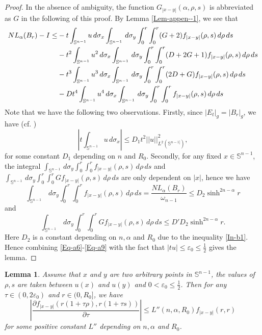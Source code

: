 \documentclass[11pt,reqno]{amsart}
\newtheorem{lem}[thm]{Lemma}
\theoremstyle{definition}
\theoremstyle{remark}
\numberwithin{equation}{section}
\renewcommand{\(}{\left(}
\renewcommand{\)}{\right)}
\renewcommand{\-}{\overline}
\begin{document}
\begin{proof}
	In the absence of ambiguity, the function $G_{|x-y|}(\alpha,\rho,s)$ is abbreviated as $G$ in the following of this proof. By Lemma \ref{Lem-appen--1}, we see that 
	\begin{align}
		NL_{\alpha}(B_r)-I\leq& -t\int_{\mathbb{S}^{n-1}}u\,d\sigma_x\int_{\mathbb{S}^{n-1}}\,d\sigma_y\int_0^{r}\int_0^{r}(G+2)f_{|x-y|}(\rho,s)\,d\rho\,ds\notag\\
		&-t^2\int_{\mathbb{S}^{n-1}}u^2\,d\sigma_x\int_{\mathbb{S}^{n-1}}\,d\sigma_y\int_0^{r}\int_0^{r}(D+2G+1)f_{|x-y|}(\rho,s)\,d\rho\,ds\notag\\
		&-t^3\int_{\mathbb{S}^{n-1}}u^3\,d\sigma_x\int_{\mathbb{S}^{n-1}}\,d\sigma_y\int_0^{r}\int_0^{r}(2D+G)f_{|x-y|}(\rho,s)\,d\rho\,ds\notag\\
		&-Dt^4\int_{\mathbb{S}^{n-1}}u^4\,d\sigma_x\int_{\mathbb{S}^{n-1}}\,d\sigma_y\int_0^{r}\int_0^{r}f_{|x-y|}(\rho,s)\,d\rho\,ds\label{Eq-a6}
	\end{align}
	Note that we have the following two observations. Firstly, since $|E_t|_g=|B_r|_g$, we have (cf. \cite[Equation (4.5)]{Bogelein15})
	\begin{equation}\label{Eq-a7}
		\left|t\int_{\mathbb{S}^{n-1}}u\,d\sigma_x\right|\leq D_1t^2||u||^2_{L^2(\mathbb{S}^{n-1]})},
	\end{equation}
	for some constant $D_1$ depending on $n$ and $R_0$. Secondly, for any fixed $x\in\mathbb{S}^{n-1}$, the integral $\int_{\mathbb{S}^{n-1}}\,d\sigma_y\int_0^{r}\int_0^{r}f_{|x-y|}(\rho,s)\,d\rho\,ds$ and $\int_{\mathbb{S}^{n-1}}\,d\sigma_y\int_0^{r}\int_0^{r}Gf_{|x-y|}(\rho,s)\,d\rho\,ds$ are only dependent on $|x|$, hence we have
	\begin{equation}\label{Eq-a8}
		\int_{\mathbb{S}^{n-1}}\,d\sigma_y\int_0^{r}\int_0^{r}f_{|x-y|}(\rho,s)\,d\rho\,ds=\frac{NL_{\alpha}(B_r)}{\omega_{n-1}}\leq D_2\sinh^{2n-\alpha}r
	\end{equation}
	and 
	\begin{equation}\label{Eq-a9}
		\int_{\mathbb{S}^{n-1}}\,d\sigma_y\int_0^{r}\int_0^{r}Gf_{|x-y|}(\rho,s)\,d\rho\,ds\leq D'D_2\sinh^{2n-\alpha} r.
	\end{equation}
	Here $D_2$ is a constant depending on $n,\alpha$ and $R_0$ due to the inequality \eqref{In-b1}. Hence combining \eqref{Eq-a6}-\eqref{Eq-a9} with the fact that $|tu|\leq\varepsilon_0\leq\frac{1}{2}$ gives the lemma.
\end{proof}
\begin{lem}\label{Lem-appen}
	Assume that $x$ and $y$ are two arbitrary points in $\mathbb{S}^{n-1}$, the values of $\rho, s$ are taken between $u(x)$ and $u(y)$ and $0<\varepsilon_0\leq\frac{1}{2}$. Then for any $\tau\in(0,2\varepsilon_0)$ and $r\in(0,R_0]$, we have 
	\begin{equation}
			\left|\frac{\partial f_{|x-y|}(r(1+\tau\rho),r(1+\tau s))}{\partial\tau}\right|\leq L''(n,\alpha,R_0)f_{|x-y|}(r,r)
	\end{equation}
for some positive constant $L''$ depending on $n,\alpha$ and $R_0$.
\end{lem}
\end{document}
